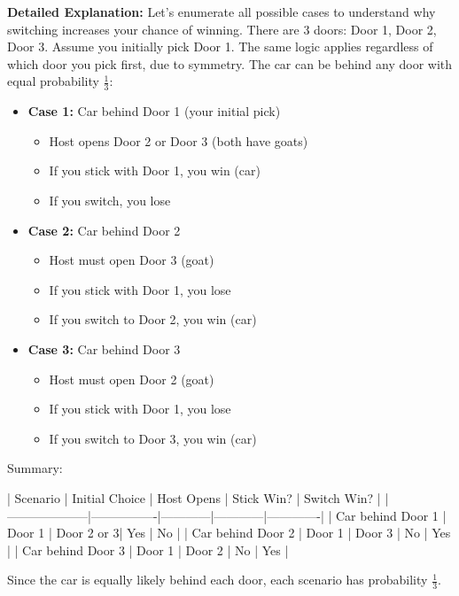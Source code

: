 \documentclass[11pt]{article}
\begin{document}
\textbf{Detailed Explanation:}
Let's enumerate all possible cases to understand why switching increases your chance of winning.
There are 3 doors: Door 1, Door 2, Door 3.
Assume you initially pick Door 1.
The same logic applies regardless of which door you pick first, due to symmetry.
The car can be behind any door with equal probability $\frac{1}{3}$:

\begin{itemize}
  \item \textbf{Case 1:} Car behind Door 1 (your initial pick)
  \begin{itemize}
    \item Host opens Door 2 or Door 3 (both have goats)
    \item If you stick with Door 1, you win (car)
    \item If you switch, you lose
  \end{itemize}

  \item \textbf{Case 2:} Car behind Door 2
  \begin{itemize}
    \item Host must open Door 3 (goat)
    \item If you stick with Door 1, you lose
    \item If you switch to Door 2, you win (car)
  \end{itemize}

  \item \textbf{Case 3:} Car behind Door 3
  \begin{itemize}
    \item Host must open Door 2 (goat)
    \item If you stick with Door 1, you lose
    \item If you switch to Door 3, you win (car)
  \end{itemize}
\end{itemize}

Summary:

| Scenario           | Initial Choice | Host Opens | Stick Win? | Switch Win? |
|--------------------|----------------|------------|------------|-------------|
| Car behind Door 1   | Door 1         | Door 2 or 3| Yes        | No          |
| Car behind Door 2   | Door 1         | Door 3     | No         | Yes         |
| Car behind Door 3   | Door 1         | Door 2     | No         | Yes         |

Since the car is equally likely behind each door, each scenario has probability $\frac{1}{3}$.
\end{document}
